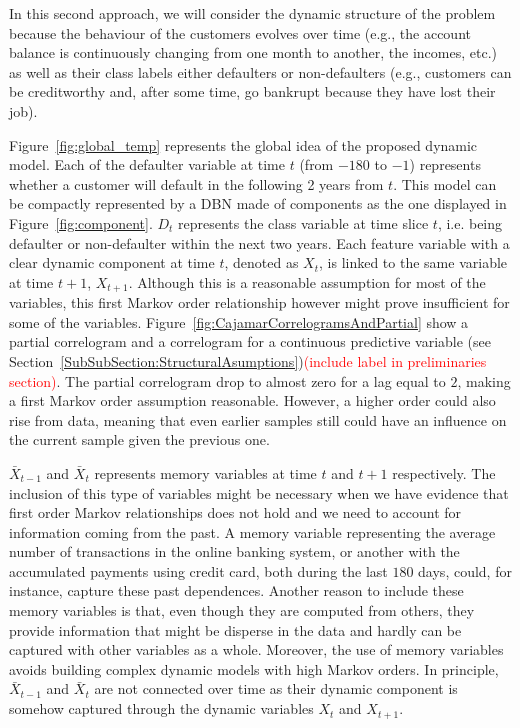 In this second approach, we will consider the dynamic structure of the problem because the behaviour of the customers evolves over time (e.g., the account balance is continuously changing from one month to another, the incomes, etc.) as well as their class labels either defaulters or non-defaulters (e.g., customers can be creditworthy and, after some time, go bankrupt because they have lost their job). 

Figure~\ref{fig:global_temp} represents the global idea of the proposed dynamic model. Each of the defaulter variable at time $t$ (from $-180$ to $-1$) represents whether a customer will default in the following 2 years from $t$. This model can be compactly represented by a DBN made of components as the one displayed in 
Figure~\ref{fig:component}. $D_t$ represents the class variable at time slice $t$, i.e. being defaulter or non-defaulter within the next two years. Each feature variable with a clear dynamic component at time $t$, denoted as $X_t$, is linked to the same variable at time $t+1$, $X_{t+1}$. Although this is a reasonable assumption for most of the variables, this first Markov order relationship however might prove insufficient for some of the variables. Figure~\ref{fig:CajamarCorrelogramsAndPartial} show a partial correlogram and a correlogram for a continuous predictive variable (see Section~\ref{SubSubSection:StructuralAsumptions})\textcolor{red}{(include label in preliminaries section)}. The partial correlogram drop to almost zero for a lag equal to $2$, making a first Markov order assumption reasonable. However, a higher order could also rise from data, meaning that even earlier samples still could have an influence on the current sample given the previous one. 

$\bar{X}_{t-1}$ and $\bar{X}_{t}$ represents memory variables at time $t$ and $t+1$ respectively. The inclusion of this type of variables might be necessary when we have evidence that first order Markov relationships does not hold and we need to account for information coming from the past. A memory variable representing the average number of transactions in the online banking system, or another with the accumulated payments using credit card, both during the last $180$ days, could, for instance, capture these past dependences. Another reason to include these memory variables is that, even though they are computed from others, they provide information that might be disperse in the data and hardly can be captured with other variables as a whole. Moreover, the use of memory variables avoids building complex dynamic models with high Markov orders. In principle, $\bar{X}_{t-1}$ and $\bar{X}_{t}$ are not connected over time as their dynamic component is somehow captured through the dynamic variables $X_{t}$ and $X_{t+1}$.


